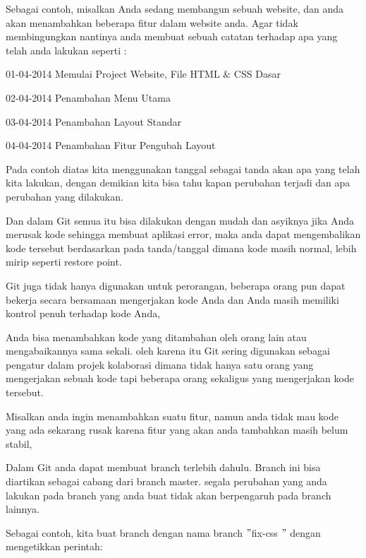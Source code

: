 \noindent 
Sebagai contoh, misalkan Anda sedang membangun sebuah website, dan anda akan menambahkan beberapa fitur dalam website anda. Agar tidak membingungkan nantinya anda membuat sebuah catatan terhadap apa yang telah anda lakukan seperti : \par
\noindent 
 \hspace*{0.5in} 01-04-2014 Memulai Project Website, File HTML  $  \&  $ CSS Dasar \par
\noindent 
 \hspace*{0.5in} 02-04-2014 Penambahan Menu Utama \par
\noindent 
 \hspace*{0.5in} 03-04-2014 Penambahan Layout Standar \par
\noindent 
 \hspace*{0.5in} 04-04-2014 Penambahan Fitur Pengubah Layout \par
\noindent 
Pada contoh diatas kita menggunakan tanggal sebagai tanda akan apa yang telah kita lakukan, dengan demikian kita bisa tahu kapan perubahan terjadi dan apa perubahan yang dilakukan.  \par
\noindent 
Dan dalam Git semua itu bisa dilakukan dengan mudah dan asyiknya jika Anda merusak kode sehingga membuat aplikasi error, maka anda dapat mengembalikan kode tersebut berdasarkan pada tanda/tanggal dimana kode masih normal, lebih mirip seperti restore point. \par
\noindent 
Git juga tidak hanya digunakan untuk perorangan, beberapa orang pun dapat bekerja secara bersamaan mengerjakan kode Anda dan Anda masih memiliki kontrol penuh terhadap kode Anda,  \par
\noindent 
Anda bisa menambahkan kode yang ditambahan oleh orang lain atau mengabaikannya sama sekali. oleh karena itu Git sering digunakan sebagai pengatur dalam projek kolaborasi dimana tidak hanya satu orang yang mengerjakan sebuah kode tapi beberapa orang sekaligus yang mengerjakan kode tersebut. \par
\noindent 
Misalkan anda ingin menambahkan suatu fitur, namun anda tidak mau kode yang ada sekarang rusak karena fitur yang akan anda tambahkan masih belum stabil,  \par
\noindent 
Dalam Git anda dapat membuat branch terlebih dahulu. Branch ini bisa diartikan sebagai cabang dari branch master. segala perubahan yang anda lakukan pada branch yang anda buat tidak akan berpengaruh pada branch lainnya. \par
\noindent 
Sebagai contoh, kita buat branch dengan nama branch  $ " $fix-css $ " $ dengan mengetikkan perintah: \par
